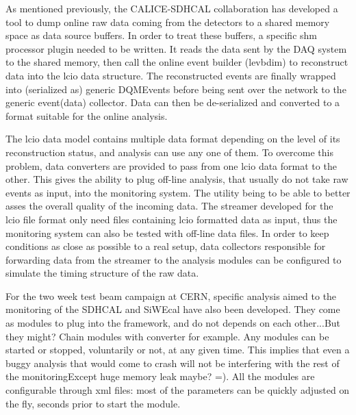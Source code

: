\documentclass[conference]{IEEEtran}
\begin{document}

As mentioned previously, the CALICE-SDHCAL collaboration has developed a tool to dump online raw data coming from the detectors to a shared memory space as data source buffers. In order to treat these buffers, a specific shm processor plugin needed to be written. It reads the data sent by the DAQ system to the shared memory, then call the online event builder (levbdim) to reconstruct data into the lcio data structure. The reconstructed events are finally wrapped into {\color{red}(serialized as)} generic DQMEvents before being sent over the network to the generic event{\color{red}(data)} collector. Data can then be de-serialized and converted to a format suitable for the online analysis.

The lcio data model contains multiple data format depending on the level of its reconstruction status, and analysis can use any one of them. To overcome this problem, data converters are provided to pass from one lcio data format to the other. This gives the ability to plug off-line analysis, that usually do not take raw events as input, into the monitoring system. The utility being to be able to better asses the overall quality of the incoming data.
The streamer developed for the lcio file format only need files containing lcio formatted data as input, thus the monitoring system can also be tested with off-line data files. In order to keep conditions as close as possible to a real setup, data collectors responsible for forwarding data from the streamer to the analysis modules can be configured to simulate the timing structure of the raw data.


For the two week test beam campaign at CERN, specific analysis aimed to the monitoring of the SDHCAL and SiWEcal have also been developed. They come as modules to plug into the framework, and do not depends on each other...{\color{red}But they might? Chain modules with converter for example}. Any modules can be started or stopped, voluntarily or not, at any given time. This implies that even a buggy analysis that would come to crash will not be interfering with the rest of the monitoring{\color{red}Except huge memory leak maybe? =)}. All the modules are configurable through xml files: most of the parameters can be quickly adjusted {\color{red}on the fly}, seconds prior to start the module.
\end{document}
